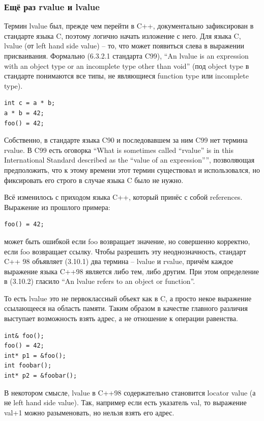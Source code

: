 \documentclass[a4paper,12pt,oneside]{article}
\begin{document}
\subsubsection{Ещё раз rvalue и lvalue}

Термин lvalue был, прежде чем перейти в C++, документально зафиксирован в стандарте языка C, поэтому логично начать изложение с него. Для языка C, lvalue (от left hand side value) -- то, что может появиться слева в выражении присваивания. Формально (6.3.2.1 стандарта C99), ``An lvalue is an expression with an object type or an incomplete type other than void'' (под object type в стандарте понимаются все типы, не являющиеся function type или incomplete type).

\begin{lstlisting}
int c = a * b;
a * b = 42;
foo() = 42;
\end{lstlisting}

Собственно, в стандарте языка C90 и последовавшем за ним C99 нет термина rvalue. В C99 есть оговорка ``What is sometimes called ``rvalue'' is in this International Standard described as the ``value of an expression'''', позволяющая предположить, что к этому времени этот термин существовал и использовался, но фиксировать его строго в случае языка C было не нужно.

Всё изменилось с приходом языка C++, который принёс с собой references. Выражение из прошлого примера:

\begin{lstlisting}
foo() = 42;
\end{lstlisting}

может быть ошибкой если foo возвращает значение, но совершенно корректно, если foo возвращает ссылку. Чтобы разрешить эту неоднозначность, стандарт C++ 98 объявляет (3.10.1) два термина -- lvalue и rvalue, причём каждое выражение языка C++98 является либо тем, либо другим. При этом определение в (3.10.2) гласило ``An lvalue refers to an object or function''.

То есть lvalue это не первоклассный объект как в C, а просто некое выражение ссылающееся на область памяти. Таким образом в качестве главного различия выступает возможность взять адрес, а не отношение к операции равенства.

\begin{lstlisting}
int& foo();
foo() = 42;
int* p1 = &foo();
int foobar();
int* p2 = &foobar();
\end{lstlisting}

В некотором смысле, lvalue в C++98 содержательно становится locator value (а не left hand side value). Так, например если есть указатель val, то выражение val+1 можно разыменовать, но нельзя взять его адрес.
\end{document}
